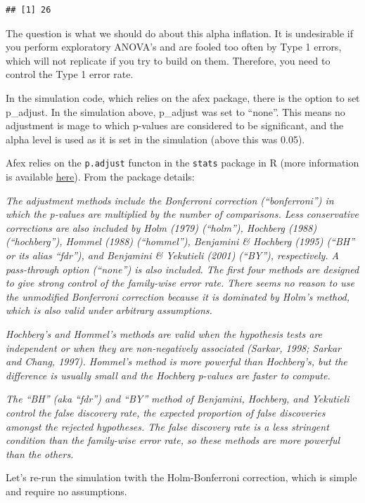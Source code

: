 \documentclass[]{book}
\begin{document}
\begin{verbatim}
## [1] 26
\end{verbatim}

The question is what we should do about this alpha inflation. It is undesirable if you perform exploratory ANOVA's and are fooled too often by Type 1 errors, which will not replicate if you try to build on them. Therefore, you need to control the Type 1 error rate.

In the simulation code, which relies on the afex package, there is the option to set p\_adjust. In the simulation above, p\_adjust was set to ``none''. This means no adjustment is mage to which p-values are considered to be significant, and the alpha level is used as it is set in the simulation (above this was 0.05).

Afex relies on the \texttt{p.adjust} functon in the \texttt{stats} package in R (more information is available \href{https://www.rdocumentation.org/packages/stats/versions/3.1.1/topics/p.adjust}{here}). From the package details:

\emph{The adjustment methods include the Bonferroni correction (``bonferroni'') in which the p-values are multiplied by the number of comparisons. Less conservative corrections are also included by Holm (1979) (``holm''), Hochberg (1988) (``hochberg''), Hommel (1988) (``hommel''), Benjamini \& Hochberg (1995) (``BH'' or its alias ``fdr''), and Benjamini \& Yekutieli (2001) (``BY''), respectively. A pass-through option (``none'') is also included. The first four methods are designed to give strong control of the family-wise error rate. There seems no reason to use the unmodified Bonferroni correction because it is dominated by Holm's method, which is also valid under arbitrary assumptions.}

\emph{Hochberg's and Hommel's methods are valid when the hypothesis tests are independent or when they are non-negatively associated (Sarkar, 1998; Sarkar and Chang, 1997). Hommel's method is more powerful than Hochberg's, but the difference is usually small and the Hochberg p-values are faster to compute.}

\emph{The ``BH'' (aka ``fdr'') and ``BY'' method of Benjamini, Hochberg, and Yekutieli control the false discovery rate, the expected proportion of false discoveries amongst the rejected hypotheses. The false discovery rate is a less stringent condition than the family-wise error rate, so these methods are more powerful than the others.}

Let's re-run the simulation twith the Holm-Bonferroni correction, which is simple and require no assumptions.
\end{document}
